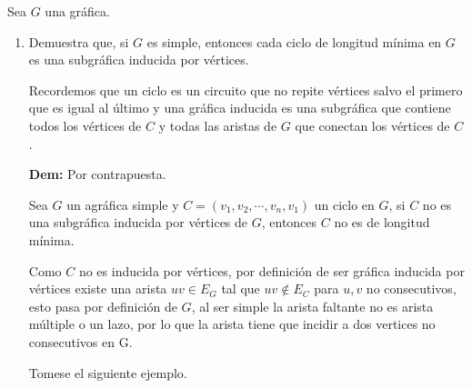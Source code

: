 Sea $G$ una gráfica.
\begin{enumerate}
    \item Demuestra que, si $G$ es simple, entonces cada ciclo de longitud mínima en $G$ es una subgráfica inducida por vértices.

          Recordemos que un ciclo es un circuito que no repite vértices salvo el primero que es igual al último y una gráfica inducida es una subgráfica que contiene todos los vértices de $C$ y todas las aristas de $G$ que conectan los vértices de $C$.


          \textbf{Dem:} Por contrapuesta.

          Sea $G$ un agráfica simple y $C=(v_1,v_2,\cdots,v_n,v_1)$ un ciclo en $G$, si $C$ no es una subgráfica inducida por vértices de $G$, entonces $C$ no es de longitud mínima.

          Como $C$ no es inducida por vértices, por definición de ser gráfica inducida por vértices existe una arista $uv\in E_G$ tal que $uv\notin E_C$ para $u,v$ no consecutivos, esto pasa por definición de $G$, al ser simple la arista faltante no es arista múltiple o un lazo, por lo que la arista tiene que incidir a dos vertices no consecutivos en G.

          Tomese el siguiente ejemplo.
          \begin{figure}[!hbt]
            \begin{center}
\end{center}
\end{figure}
\end{enumerate}
